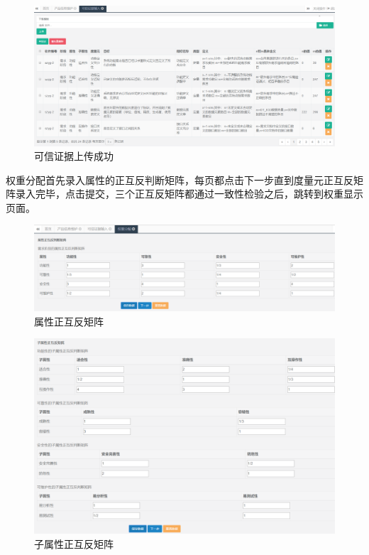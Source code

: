 \begin{figure}[htb]
	\centering
	\includegraphics[width=13cm]{fig/sy5_16.png}
	\caption{可信证据上传成功}
	\label{fig:5_16}
\end{figure}

权重分配首先录入属性的正互反判断矩阵，每页都点击下一步直到度量元正互反矩阵录入完毕，点击提交，三个正互反矩阵都通过一致性检验之后，跳转到权重显示页面。
\begin{figure}[htb]
	\centering
	\includegraphics[width=13cm]{fig/sy5_17.png}
	\caption{属性正互反矩阵}
	\label{fig:5_17}
\end{figure}
\begin{figure}[htb]
	\centering
	\includegraphics[width=13cm]{fig/sy5_18.png}
	\caption{子属性正互反矩阵}
	\label{fig:5_17}
\end{figure}
